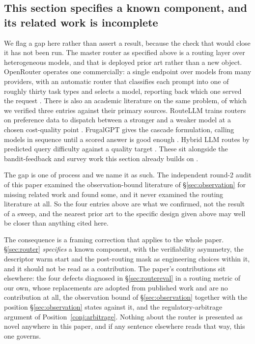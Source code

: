 \documentclass[11pt]{article}
\begin{document}
\subsection{This section specifies a known component, and its related work is incomplete}
\label{sec:routerpriorart}

We flag a gap here rather than assert a result, because the check that would close it has not been run. The master router as specified above is a routing layer over heterogeneous models, and that is deployed prior art rather than a new object. OpenRouter operates one commercially: a single endpoint over models from many providers, with an automatic router that classifies each prompt into one of roughly thirty task types and selects a model, reporting back which one served the request \cite{openrouter2026}. There is also an academic literature on the same problem, of which we verified three entries against their primary sources. RouteLLM trains routers on preference data to dispatch between a stronger and a weaker model at a chosen cost-quality point \cite{ong2024routellm}. FrugalGPT gives the cascade formulation, calling models in sequence until a scored answer is good enough \cite{chen2023frugalgpt}. Hybrid LLM routes by predicted query difficulty against a quality target \cite{ding2024hybridllm}. These sit alongside the bandit-feedback and survey work this section already builds on \cite{banditrouting2025,routingsurvey2026}.

The gap is one of process and we name it as such. The independent round-2 audit of this paper examined the observation-bound literature of \S\ref{sec:observation} for missing related work and found some, and it never examined the routing literature at all. So the four entries above are what we confirmed, not the result of a sweep, and the nearest prior art to the specific design given above may well be closer than anything cited here.

The consequence is a framing correction that applies to the whole paper. \S\ref{sec:router} \emph{specifies} a known component, with the verifiability asymmetry, the descriptor warm start and the post-routing mask as engineering choices within it, and it should not be read as a contribution. The paper's contributions sit elsewhere: the four defects diagnosed in \S\ref{sec:routereval} in a routing metric of our own, whose replacements are adopted from published work and are no contribution at all, the observation bound of \S\ref{sec:observation} together with the position \S\ref{sec:observation} states against it, and the regulatory-arbitrage argument of Position~\ref{conj:arbitrage}. Nothing about the router is presented as novel anywhere in this paper, and if any sentence elsewhere reads that way, this one governs.
\end{document}
